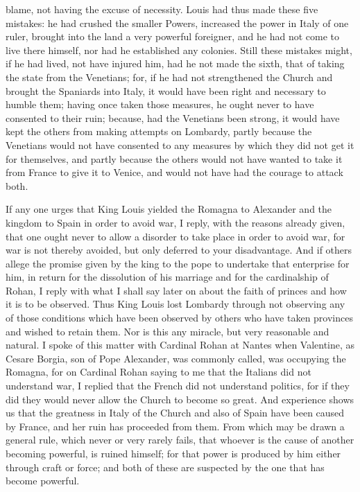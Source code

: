 \documentclass[12pt,letterpaper]{memoir}
\begin{document}
blame, not having the excuse of necessity. Louis had thus made these
five mistakes: he had crushed the smaller Powers, increased the power
in Italy of one ruler, brought into the land a very powerful foreigner,
and he had not come to live there himself, nor had he established
any colonies. Still these mistakes might, if he had lived, not have
injured him, had he not made the sixth, that of taking the state from
the Venetians; for, if he had not strengthened the Church and brought
the Spaniards into Italy, it would have been right and necessary to
humble them; having once taken those measures, he ought never to have
consented to their ruin; because, had the Venetians been strong, it
would have kept the others from making attempts on Lombardy, partly
because the Venetians would not have consented to any measures by which
they did not get it for themselves, and partly because the others would
not have wanted to take it from France to give it to Venice, and would
not have had the courage to attack both.

If any one urges that King Louis yielded the Romagna to Alexander
and the kingdom to Spain in order to avoid war, I reply, with the
reasons already given, that one ought never to allow a disorder to take
place in order to avoid war, for war is not thereby avoided, but only
deferred to your disadvantage. And if others allege the promise given
by the king to the pope to undertake that enterprise for him, in return
for the dissolution of his marriage and for the cardinalship of Rohan,
I reply with what I shall say later on about the faith of princes and
how it is to be observed. Thus King Louis lost Lombardy through not
observing any of those conditions which have been observed by others
who have taken provinces and wished to retain them. Nor is this any
miracle, but very reasonable and natural. I spoke of this matter with
Cardinal Rohan at Nantes when Valentine, as Cesare Borgia, son of Pope
Alexander, was commonly called, was occupying the Romagna, for on
Cardinal Rohan saying to me that the Italians did not understand war,
I replied that the French did not understand politics, for if they did
they would never allow the Church to become so great. And experience
shows us that the greatness in Italy of the Church and also of Spain
have been caused by France, and her ruin has proceeded from them. From
which may be drawn a general rule, which never or very rarely fails,
that whoever is the cause of another becoming powerful, is ruined
himself; for that power is produced by him either through craft or
force; and both of these are suspected by the one that has become
powerful.
\end{document}
